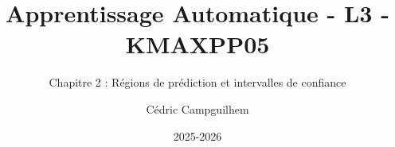 \documentclass[10pt]{beamer}  %
\title{Apprentissage Automatique - L3 - KMAXPP05}
\subtitle{Chapitre 2 : Régions de prédiction et intervalles de confiance}
\author{Cédric Campguilhem}
\institute[]{
	Airbus Operations \\
	\href{mailto:cedric.campguilhem@airbus.com}{\texttt{cedric.campguilhem@airbus.com}}
}
\date{2025-2026}
\begin{document}
	
\begin{frame}
	\titlepage
\end{frame}
	






\end{document}
